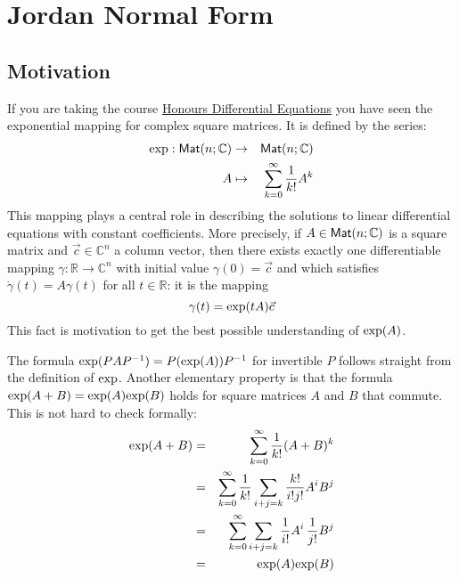 \documentclass[11pt]{amsbook}
\theoremstyle{definition}
\begin{document}
\chapter{Jordan Normal Form}\label{JNF}

\section{Motivation}

 If you are taking the course \href{http://www.drps.ed.ac.uk/14-15/dpt/cxmath10066.htm}{Honours Differential Equations} you have seen the exponential mapping for complex square matrices. It is defined by the series: \begin{eqnarray*} {\rm exp}: {\sf Mat}(n; \mathbb{C}) &\to & {\sf Mat}(n; \mathbb{C}) \\ A & \mapsto & \sum_{k=0}^{\infty} \frac{1}{k!} A^k \end{eqnarray*} This mapping plays a central role in describing the solutions to linear differential equations with constant coefficients. More precisely, if $A\in {\sf Mat}(n; \mathbb{C})$ is a square matrix and $\vec{c}\in \mathbb{C}^n$ a column vector, then there exists exactly one differentiable mapping $\gamma: \mathbb{R} \to \mathbb{C}^n$ with initial value $\gamma (0) = \vec{c}$ and which satisfies $\dot{\gamma}(t) = A\gamma(t)$ for all $t\in \mathbb{R}$: it is the mapping $$\gamma(t) = {\rm exp}(tA)\vec{c}$$ This fact is motivation to get the best possible understanding of ${\rm exp} (A)$.

The formula ${\rm exp}(PAP^{-1}) = P ({\rm exp}( A))P^{-1}$ for invertible $P$ follows straight from the definition of ${\rm exp}$. Another elementary property is that the formula $ {\rm exp}(A+B) = {\rm exp}(A){\rm exp}(B)$ holds for square matrices $A$ and $B$ that commute. This is not hard to check formally:
\begin{eqnarray*} {\rm exp}(A+B) &=& \sum_{k=0}^{\infty} \frac{1}{k!} (A+B)^k \\ & = & \sum_{k=0}^{\infty} \frac{1}{k!} \sum_{i+j=k} \frac{k!}{i!j!}A^iB^j \\ & = & \sum_{k=0}^{\infty} \sum_{i+j = k} \frac{1}{i!}A^i \, \frac{1}{j!} B^j \\ &=& {\rm exp}(A) {\rm exp}(B)
\end{eqnarray*}
\end{document}
